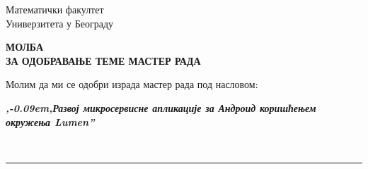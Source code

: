 \documentclass[a4paper]{article}
\def\zn{,\kern-0.09em,}
\begin{document}
\thispagestyle{empty}

\begin{flushleft}
Математички факултет\\
Универзитета у Београду
\end{flushleft}

\bigskip

\begin{center}
\textbf{МОЛБА\\
ЗА ОДОБРАВАЊЕ ТЕМЕ МАСТЕР РАДА
}\end{center}

\bigskip

\begin{flushleft}
Молим да ми се одобри израда мастер рада под насловом:
\end{flushleft}

\begin{minipage}{16.5cm}
\textbf{\textit{\zn Развој микросервисне апликације за Андроид коришћењем окружења Lumen''}}
\end{minipage}\\
\rule[4mm]{17.5cm}{.05mm}
\end{document}
